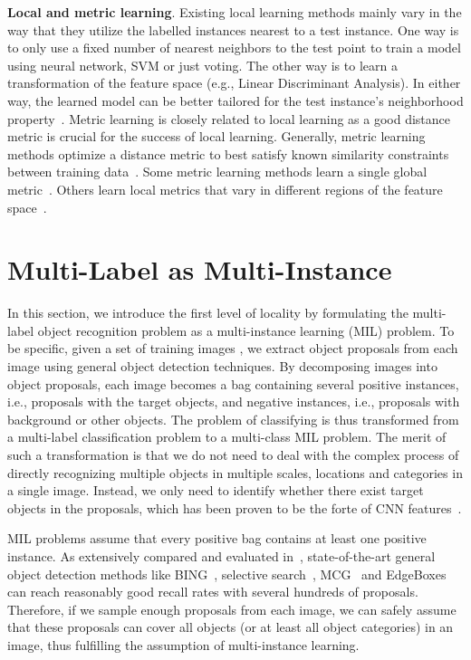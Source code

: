 \documentclass[10pt,twocolumn,letterpaper]{article}
\begin{document}
{\bf Local and metric learning}. Existing local learning methods
mainly vary in the way that they utilize the labelled instances
nearest to a test instance. One way is to only use a fixed number
of nearest neighbors to the test point to train a model using
neural network, SVM or just voting. The other way is to learn a
transformation of the feature space (e.g., Linear Discriminant
Analysis). In either way, the learned model can be better tailored
for the test instance's neighborhood property~\cite{Hastie1996}.
Metric learning is closely related to local learning as a good
distance metric is crucial for the success of local learning.
Generally, metric learning methods optimize a distance metric to
best satisfy known similarity constraints between training
data~\cite{Bellet2013}. Some metric learning methods learn a
single global metric~\cite{Weinberger2009}. Others learn local
metrics that vary in different regions of the feature
space~\cite{Yang2006}.

\section{Multi-Label as Multi-Instance} \label{mi}
In this section, we introduce the first level of locality by
formulating the multi-label object recognition problem as a
multi-instance learning (MIL) problem. To be specific, given a set
of  training images , we
extract  object proposals 
from each image  using general object detection
techniques. By decomposing images into object proposals, each
image  becomes a bag containing several positive
instances, i.e., proposals with the target objects, and negative
instances, i.e., proposals with background or other objects. The
problem of classifying  is thus transformed from a
multi-label classification problem to a multi-class MIL problem.
The merit of such a transformation is that we do not need to deal
with the complex process of directly recognizing multiple objects
in multiple scales, locations and categories in a single image.
Instead, we only need to identify whether there exist target
objects in the proposals, which has been proven to be the forte of
CNN features~\cite{girshick2014}.

MIL problems assume that every positive bag contains at least one
positive instance. As extensively compared and evaluated
in~\cite{Hosang2014}, state-of-the-art general object detection
methods like BING~\cite{Cheng2014}, selective
search~\cite{Uijlings2013}, MCG~\cite{Arbelaez2014} and
EdgeBoxes~\cite{Zitnick2014} can reach reasonably good recall
rates with several hundreds of proposals. Therefore, if we sample
enough proposals from each image, we can safely assume that these
proposals can cover all objects (or at least all object
categories) in an image, thus fulfilling the assumption of
multi-instance learning.
\end{document}
